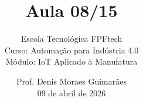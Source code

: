 \title{Aula 08/15}

\subtitle{
\vspace{1.0cm}
Escola Tecnológica FPFtech\\
\vspace{0.5cm}
Curso: Automação para Indústria 4.0\\
\vspace{0.5cm}
Módulo: IoT Aplicado à Manufatura
\vspace{1.0cm}
}

\author{
Prof. Denis Moraes Guimarães\\
\small 09 de abril de 2026
}

\date{}